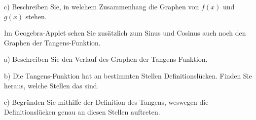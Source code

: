 \documentclass[11pt, a4paper, oneside]{article}
\begin{document}
	\lines[3cm]
	
	c) Beschreiben Sie, in welchem Zusammenhang die Graphen von $f(x)$ und $g(x)$ stehen.
	
	\lines[3cm]
	
	
	
	Im Geogebra-Applet sehen Sie zusätzlich zum Sinus und Cosinus auch noch den Graphen der Tangens-Funktion.
	
	\begin{minipage}{.75\textwidth}
		a) Beschreiben Sie den Verlauf des Graphen der Tangens-Funktion.
		
		\lines[3cm]
	\end{minipage}
	\begin{minipage}{.25\textwidth}
	\end{minipage}
	
	b) Die Tangens-Funktion hat an bestimmten Stellen Definitionslücken.
	Finden Sie heraus, welche Stellen das sind.
	
	\lines[2cm]
	
	c) Begründen Sie mithilfe der Definition des Tangens, weswegen die Definitionslücken genau an diesen Stellen auftreten.
	
	\lines[3cm]
\end{document}

